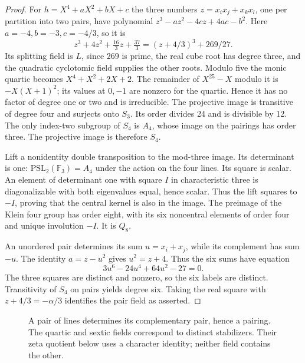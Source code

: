 \documentclass[11pt]{article}
\newcommand{\Q}{\mathbb Q}
\newcommand{\F}{\mathbb F}
\begin{document}
\begin{proof}
For \(h=X^4+aX^2+bX+c\) the three numbers
\(z=x_ix_j+x_kx_l\), one per partition into two pairs, have polynomial
\(z^3-az^2-4cz+4ac-b^2\). Here \(a=-4,b=-3,c=-4/3\), so it is
\[
 z^3+4z^2+\tfrac{16}3z+\tfrac{37}3=(z+4/3)^3+269/27.
\]
Its splitting field is \(L\), since \(269\) is prime, the real cube root
has degree three, and the quadratic cyclotomic field supplies the other roots.
Modulo five the monic quartic becomes \(X^4+X^2+2X+2\). The remainder
of \(X^{25}-X\) modulo it is \(-X(X+1)^2\); its values at \(0,-1\) are
nonzero for the quartic. Hence it has no factor of degree one or two and is
irreducible. The projective image is transitive of degree four and surjects
onto \(S_3\). Its order divides 24 and is divisible by 12. The only index-two
subgroup of \(S_4\) is \(A_4\), whose image on the pairings has order three.
The projective image is therefore \(S_4\).

Lift a nonidentity double transposition to the mod-three image. Its determinant
is one: \(\mathrm{PSL}_2(\F_3)=A_4\) under the action on the four lines.
Its square is scalar. An element of determinant one with square \(I\) in
characteristic three is diagonalizable with both eigenvalues equal, hence
scalar. Thus the lift squares to \(-I\), proving that the central kernel
is also in the image. The preimage of the Klein four group has order eight,
with its six noncentral elements of order four and unique involution \(-I\).
It is \(Q_8\).

An unordered pair determines its sum \(u=x_i+x_j\), while its complement has
sum \(-u\). The identity \(a=z-u^2\) gives \(u^2=z+4\).
Thus the six sums have equation
\[
  3u^6-24u^4+64u^2-27=0 .
\]
The three squares are distinct and nonzero, so the six labels are distinct.
Transitivity of \(S_4\) on pairs yields degree six. Taking the real square with
\(z+4/3=-\alpha/3\) identifies the pair field as asserted.
\end{proof}

\begin{figure}[ht]
\centering
{}
\caption{A pair of lines determines its complementary pair, hence a pairing.
The quartic and sextic fields correspond to distinct stabilizers. Their
zeta quotient below uses a character identity; neither field contains the other.}
\end{figure}
\end{document}
